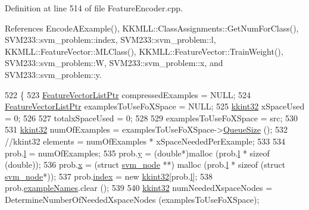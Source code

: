 Definition at line 514 of file Feature\+Encoder.\+cpp.



References Encode\+A\+Example(), K\+K\+M\+L\+L\+::\+Class\+Assignments\+::\+Get\+Num\+For\+Class(), S\+V\+M233\+::svm\+\_\+problem\+::index, S\+V\+M233\+::svm\+\_\+problem\+::l, K\+K\+M\+L\+L\+::\+Feature\+Vector\+::\+M\+L\+Class(), K\+K\+M\+L\+L\+::\+Feature\+Vector\+::\+Train\+Weight(), S\+V\+M233\+::svm\+\_\+problem\+::W, S\+V\+M233\+::svm\+\_\+problem\+::x, and S\+V\+M233\+::svm\+\_\+problem\+::y.


\begin{DoxyCode}
522 \{
523   \hyperlink{class_k_k_m_l_l_1_1_feature_vector_list}{FeatureVectorListPtr}  compressedExamples    = NULL;
524   \hyperlink{class_k_k_m_l_l_1_1_feature_vector_list}{FeatureVectorListPtr}  examplesToUseFoXSpace = NULL;
525   \hyperlink{namespace_k_k_b_a8fa4952cc84fda1de4bec1fbdd8d5b1b}{kkint32}               xSpaceUsed            = 0;
526 
527   totalxSpaceUsed = 0;
528 
529   examplesToUseFoXSpace = src;
530 
531   \hyperlink{namespace_k_k_b_a8fa4952cc84fda1de4bec1fbdd8d5b1b}{kkint32}  numOfExamples = examplesToUseFoXSpace->\hyperlink{class_k_k_b_1_1_k_k_queue_a1dab601f75ee6a65d97f02bddf71c40d}{QueueSize} ();
532   \textcolor{comment}{//kkint32  elements      = numOfExamples * xSpaceNeededPerExample;}
533 
534   prob.\hyperlink{struct_s_v_m233_1_1svm__problem_a8e80c00adc45517f894b19ce879a0405}{l}     = numOfExamples;
535   prob.\hyperlink{struct_s_v_m233_1_1svm__problem_a0883e07a3006cd2bb31eeb61c3a8c453}{y}     = (\textcolor{keywordtype}{double}*)malloc  (prob.\hyperlink{struct_s_v_m233_1_1svm__problem_a8e80c00adc45517f894b19ce879a0405}{l} * sizeof (\textcolor{keywordtype}{double}));
536   prob.\hyperlink{struct_s_v_m233_1_1svm__problem_a79a6083544d0f446a643167950c7e285}{x}     = (\textcolor{keyword}{struct }\hyperlink{struct_s_v_m233_1_1svm__node}{svm\_node} **) malloc (prob.\hyperlink{struct_s_v_m233_1_1svm__problem_a8e80c00adc45517f894b19ce879a0405}{l} * sizeof (\textcolor{keyword}{struct} 
      \hyperlink{struct_s_v_m233_1_1svm__node}{svm\_node}*));
537   prob.\hyperlink{struct_s_v_m233_1_1svm__problem_a4769752a28a7f99fa469fed248762504}{index} = \textcolor{keyword}{new} \hyperlink{namespace_k_k_b_a8fa4952cc84fda1de4bec1fbdd8d5b1b}{kkint32}[prob.\hyperlink{struct_s_v_m233_1_1svm__problem_a8e80c00adc45517f894b19ce879a0405}{l}];
538   prob.\hyperlink{struct_s_v_m233_1_1svm__problem_a5d86ac405294437f5a2da3a0e90d7bd5}{exampleNames}.clear ();
539 
540   \hyperlink{namespace_k_k_b_a8fa4952cc84fda1de4bec1fbdd8d5b1b}{kkint32}  numNeededXspaceNodes = DetermineNumberOfNeededXspaceNodes (examplesToUseFoXSpace);

\end{DoxyCode}
